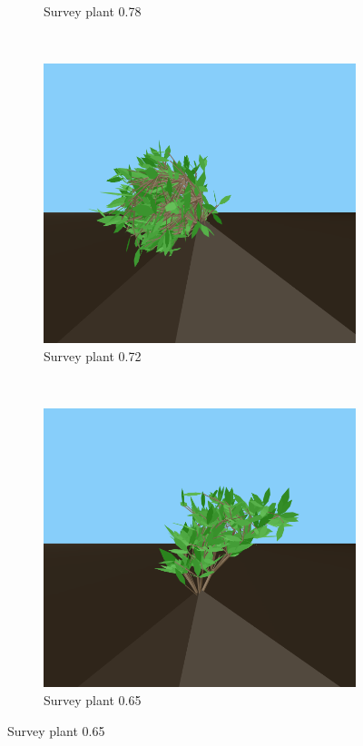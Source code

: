 \begin{figure}
\begin{subfigure}{0.48\textwidth}
        \caption{Survey plant 0.78}
    \end{subfigure}
    \\
    \begin{subfigure}{0.48\textwidth}
        \includegraphics[width=\textwidth]{figures/plant-72}
        \caption{Survey plant 0.72}
    \end{subfigure}
    ~
    \begin{subfigure}{0.48\textwidth}
        \includegraphics[width=\textwidth]{figures/plant-65}
        \caption{Survey plant 0.65}
    \end{subfigure}
\end{figure}
